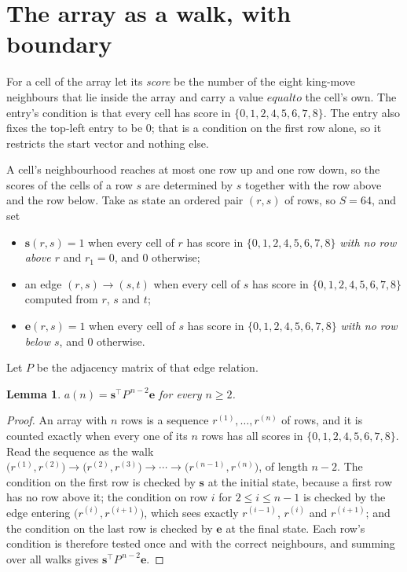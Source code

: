 \documentclass[11pt,a4paper]{article}
\theoremstyle{plain}
\newtheorem{lemma}[theorem]{Lemma}
\theoremstyle{definition}
\begin{document}
\section{The array as a walk, with boundary}

For a cell of the array let its \emph{score} be the number of the eight king-move neighbours that lie inside
the array and carry a value $equal to$ the cell's own. The entry's condition is that every cell
has score in $\{0,1,2,4,5,6,7,8\}$. The entry also fixes the top-left entry to be $0$; that is a condition on the first row alone, so it restricts the start vector and nothing else.

A cell's neighbourhood reaches at most one row up and one row down, so the scores of the
cells of a row $s$ are determined by $s$ together with the row above and the row below.
Take as state an ordered pair $(r,s)$ of rows, so $S=64$, and set
\begin{itemize}
\item $\mathbf{s}(r,s)=1$ when every cell of $r$ has score in $\{0,1,2,4,5,6,7,8\}$ \emph{with no row
above $r$} and $r_1=0$, and $0$ otherwise;
\item an edge $(r,s)\to(s,t)$ when every cell of $s$ has score in $\{0,1,2,4,5,6,7,8\}$ computed from
$r$, $s$ and $t$;
\item $\mathbf{e}(r,s)=1$ when every cell of $s$ has score in $\{0,1,2,4,5,6,7,8\}$ \emph{with no row
below $s$}, and $0$ otherwise.
\end{itemize}
Let $P$ be the adjacency matrix of that edge relation.

\begin{lemma}\label{lem:walk}
$a(n)=\mathbf{s}^{\!\top}P^{\,n-2}\mathbf{e}$ for every $n\ge2$.
\end{lemma}

\begin{proof}
An array with $n$ rows is a sequence $r^{(1)},\dots,r^{(n)}$ of rows, and it is counted
exactly when every one of its $n$ rows has all scores in $\{0,1,2,4,5,6,7,8\}$. Read the sequence as the
walk $\bigl(r^{(1)},r^{(2)}\bigr)\to\bigl(r^{(2)},r^{(3)}\bigr)\to\cdots\to
\bigl(r^{(n-1)},r^{(n)}\bigr)$, of length $n-2$. The condition on the first row is
checked by $\mathbf{s}$ at the initial state, because a first row has no row above it; the
condition on row $i$ for $2\le i\le n-1$ is checked by the edge entering
$\bigl(r^{(i)},r^{(i+1)}\bigr)$, which sees exactly $r^{(i-1)}$, $r^{(i)}$ and
$r^{(i+1)}$; and the condition on the last row is checked by $\mathbf{e}$ at the final
state. Each row's condition is therefore tested once and with the correct neighbours, and
summing over all walks gives $\mathbf{s}^{\!\top}P^{\,n-2}\mathbf{e}$.
\end{proof}
\end{document}
